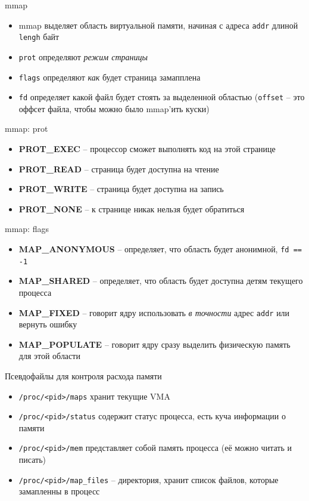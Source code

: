 \documentclass[10pt,pdf,hyperref={unicode}]{beamer}
\begin{document}
\begin{frame}{mmap}
\begin{itemize}
    \item mmap выделяет область виртуальной памяти, начиная с адреса \texttt{addr} длиной \texttt{lengh} байт
    \item \texttt{prot} определяют \emph{режим страницы}
    \item \texttt{flags} определяют \emph{как} будет страница замапплена
    \item \texttt{fd} определяет какой файл будет стоять за выделенной областью (\texttt{offset} -- это оффсет файла, чтобы можно было mmap'ить куски)
\end{itemize}
\end{frame}

\begin{frame}{mmap: prot}
\begin{itemize}
    \item \textbf{PROT\_EXEC} -- процессор сможет выполнять код на этой странице
    \item \textbf{PROT\_READ} -- страница будет доступна на чтение
    \item \textbf{PROT\_WRITE} -- страница будет доступна на запись
    \item \textbf{PROT\_NONE} -- к странице никак нельзя будет обратиться
\end{itemize}
\end{frame}

\begin{frame}{mmap: flags}
\begin{itemize}
    \item \textbf{MAP\_ANONYMOUS} -- определяет, что область будет анонимной, \texttt{fd == -1}
    \item \textbf{MAP\_SHARED} -- определяет, что область будет доступна детям текущего процесса
    \item \textbf{MAP\_FIXED} -- говорит ядру использовать \emph{в точности} адрес \texttt{addr} или вернуть ошибку
    \item \textbf{MAP\_POPULATE} -- говорит ядру сразу выделить физическую память для этой области
\end{itemize}
\end{frame}

\begin{frame}{Псевдофайлы для контроля расхода памяти}
\begin{itemize}
    \item \texttt{/proc/<pid>/maps} хранит текущие VMA
    \item \texttt{/proc/<pid>/status} содержит статус процесса, есть куча информации о памяти
    \item \texttt{/proc/<pid>/mem} представляет собой память процесса (её можно читать и писать)
    \item \texttt{/proc/<pid>/map_files} -- директория, хранит список файлов, которые замапленны в процесс
\end{itemize}
\end{frame}
\end{document}
